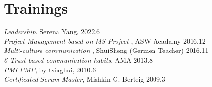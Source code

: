 
\section{Trainings}

{\em Leadership}, Serena Yang, \hfill 2022.6
\\
{\em Project Management based on MS Project }, ASW Acadamy \hfill 2016.12
\\
{\em Multi-culture communication }, ShuiSheng (Germen Teacher) \hfill 2016.11
\\
{\em 6 Trust based communication habits}, AMA \hfill 2013.8
\\
{\em PMI PMP}, by tsinghui, \hfill 2010.6
\\
{\em Certificated Scrum Master}, Mishkin G. Berteig \hfill 2009.3


